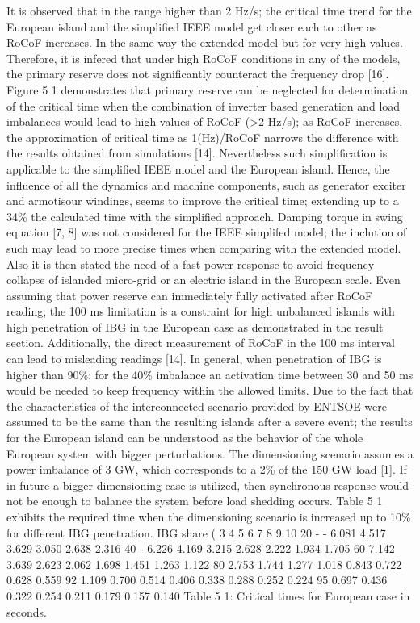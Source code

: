 It is observed that in the range higher than 2 Hz/s; the critical time trend for the European island and the  simplified IEEE model get closer each to other as RoCoF increases. In the same way the extended model but for very high values. Therefore, it is infered that under high RoCoF conditions in any of the models, the primary reserve does not significantly counteract the frequency drop [16]. Figure 5 1 demonstrates that primary reserve can be neglected for determination of the critical time when the combination of inverter based generation and load imbalances would lead to high values of RoCoF (>2 Hz/s); as RoCoF increases, the approximation of critical time as 1(Hz)/RoCoF narrows the difference with the results obtained from simulations [14]. Nevertheless such simplification is applicable to the simplified IEEE model and the European island. Hence, the influence of all the dynamics and machine components, such as generator exciter and armotisour windings, seems to improve the critical time; extending up to a 34\% the calculated time with the simplified approach. Damping torque in swing equation [7, 8] was not considered for the IEEE simplifed model; the inclution of such may lead to more precise times when comparing with the extended model.
Also it is then stated the need of a fast power response to avoid frequency collapse of islanded micro-grid or an electric island in the European scale. Even assuming that power reserve can immediately fully activated after RoCoF reading, the 100 ms limitation is a constraint for high unbalanced islands with high penetration of IBG in the European case as demonstrated in the result section. Additionally, the direct measurement of RoCoF in the 100 ms interval can lead to misleading readings [14]. In general, when penetration of IBG is higher than 90\%; for the 40\% imbalance an activation time between 30 and 50 ms would be needed to keep frequency within the allowed limits.
Due to the fact that the characteristics of the interconnected scenario provided by ENTSOE were assumed to be the same than the resulting islands after a severe event; the results for the European island can be understood as the behavior of the whole European system with bigger perturbations. The dimensioning scenario assumes a power imbalance of 3 GW, which corresponds to a 2\% of the 150 GW load [1]. If in future a bigger dimensioning case is utilized, then synchronous response would not be enough to balance the system before load shedding occurs. 
Table 5 1 exhibits the required time when the dimensioning scenario is increased up to 10\% for different IBG penetration. 
IBG share (%
	3	4	5	6	7	8	9	10
20	-	-	6.081	4.517	3.629	3.050	2.638	2.316
40	-	6.226	4.169	3.215	2.628	2.222	1.934	1.705
60	7.142	3.639	2.623	2.062	1.698	1.451	1.263	1.122
80	2.753	1.744	1.277	1.018	0.843	0.722	0.628	0.559
92	1.109	0.700	0.514	0.406	0.338	0.288	0.252	0.224
95	0.697	0.436	0.322	0.254	0.211	0.179	0.157	0.140
Table 5 1: Critical times for European case in seconds.





